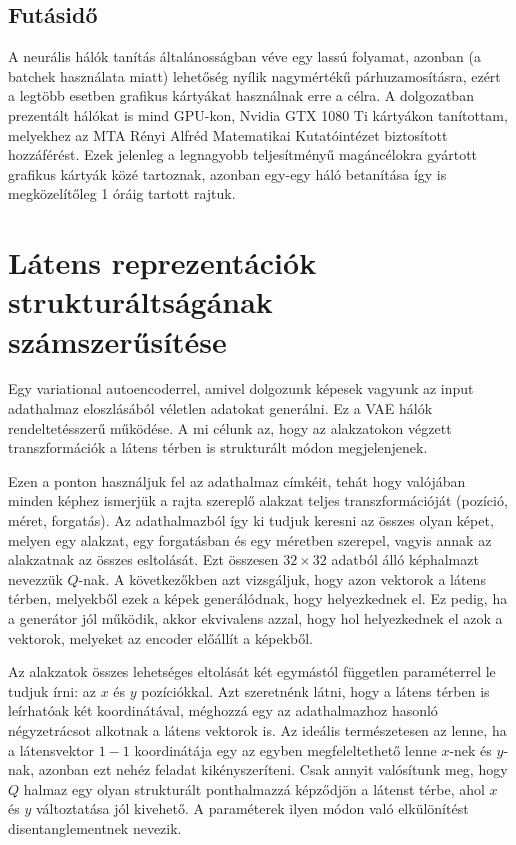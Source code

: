 \subsection{Futásidő}

A neurális hálók tanítás általánosságban véve egy lassú folyamat, azonban (a batchek használata miatt) lehetőség nyílik nagymértékű párhuzamosításra, ezért a legtöbb esetben grafikus kártyákat használnak erre a célra. A dolgozatban prezentált hálókat is mind GPU-kon, Nvidia GTX 1080 Ti kártyákon tanítottam, melyekhez az MTA Rényi Alfréd Matematikai Kutatóintézet biztosított hozzáférést. Ezek jelenleg a legnagyobb teljesítményű magáncélokra gyártott grafikus kártyák közé tartoznak, azonban egy-egy háló betanítása így is megközelítőleg 1 óráig tartott rajtuk.

\section{Látens reprezentációk strukturáltságának\\ számszerűsítése}

Egy variational autoencoderrel, amivel dolgozunk képesek vagyunk az input adathalmaz eloszlásából véletlen adatokat generálni. Ez a VAE hálók rendeltetésszerű működése. A mi célunk az, hogy az alakzatokon végzett transzformációk a látens térben is strukturált módon megjelenjenek.

Ezen a ponton használjuk fel az adathalmaz címkéit, tehát hogy valójában minden képhez ismerjük a rajta szereplő alakzat teljes transzformációját (pozíció, méret, forgatás). Az adathalmazból így ki tudjuk keresni az összes olyan képet, melyen egy alakzat, egy forgatásban és egy méretben szerepel, vagyis annak az alakzatnak az összes esltolását. Ezt összesen $32\times32$ adatból álló képhalmazt nevezzük $Q$-nak. A következőkben azt vizsgáljuk, hogy azon vektorok a látens térben, melyekből ezek a képek generálódnak, hogy helyezkednek el. Ez pedig, ha a generátor jól működik, akkor ekvivalens azzal, hogy hol helyezkednek el azok a vektorok, melyeket az encoder előállít a képekből.

Az alakzatok összes lehetséges eltolását két egymástól független paraméterrel le tudjuk írni: az $x$ és $y$ pozíciókkal. Azt szeretnénk látni, hogy a látens térben is leírhatóak két koordinátával, méghozzá egy az adathalmazhoz hasonló négyzetrácsot alkotnak a látens vektorok is. Az ideális természetesen az lenne, ha a látensvektor $1-1$ koordinátája egy az egyben megfeleltethető lenne $x$-nek és $y$-nak, azonban ezt nehéz feladat kikényszeríteni. Csak annyit valósítunk meg, hogy $Q$ halmaz egy olyan strukturált ponthalmazzá képződjön a látenst térbe, ahol $x$ és $y$ változtatása jól kivehető. A paraméterek ilyen módon való elkülönítést disentanglementnek nevezik.

